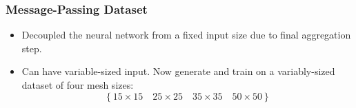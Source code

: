 \documentclass[handout]{beamer}
\renewcommand{\vec}[1]{ {\bf #1} }
\newcommand{\mat}[1]{ \vec{#1} }
\begin{document}


\begin{frame}
  \frametitle{Message-Passing Dataset}
  \begin{itemize}
  \item Decoupled the neural network from a fixed input size due to final aggregation step.
  \item Can have variable-sized input.  Now generate and train on  a variably-sized dataset of four mesh sizes:
  \[ \left\{ 15\times 15 \quad 25\times 25 \quad 35\times 35 \quad 50 \times 50 \right\} \]
  \end{itemize}
\end{frame}
\end{document}
